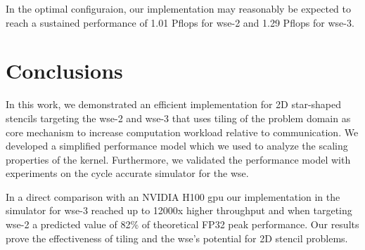 In the optimal configuraion, our implementation may reasonably be expected to reach a sustained performance of 1.01 P\ac{flops} for \ac{wse}-2 and 1.29 P\ac{flops} for \ac{wse}-3.


\section{Conclusions}
In this work, we demonstrated an efficient implementation for 2D star-shaped stencils targeting the \ac{wse}-2 and \ac{wse}-3 that uses tiling of the problem domain as core mechanism to increase computation workload relative to communication. We developed a simplified performance model which we used to analyze the scaling properties of the kernel. Furthermore, we validated the performance model with experiments on the cycle accurate simulator for the \ac{wse}.

In a direct comparison with an NVIDIA H100 \ac{gpu} our implementation in the simulator for \ac{wse}-3 reached up to 12000x higher throughput and when targeting \ac{wse}-2 a predicted value of 82\% of theoretical FP32 peak performance. Our results prove the effectiveness of tiling and the \ac{wse}'s potential for 2D stencil problems.